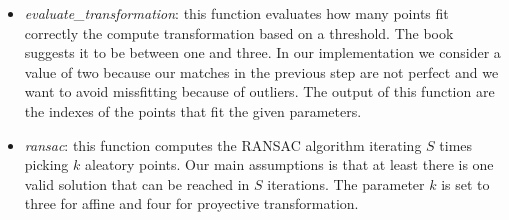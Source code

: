 \begin{itemize}
	\item \textit{evaluate\_transformation}: this function evaluates how many points fit correctly the compute transformation based on a threshold. The book suggests it to be between one and three. In our implementation we consider a value of two because our matches in the previous step are not perfect and we want to avoid missfitting because of outliers. The output of this function are the indexes of the points that fit the given parameters.

	\item \textit{ransac}: this function computes the RANSAC algorithm iterating $S$ times picking $k$ aleatory points. Our main assumptions is that at least there is one valid solution that can be reached in $S$ iterations. The parameter $k$ is set to three for affine and four for proyective transformation.
\end{itemize}
